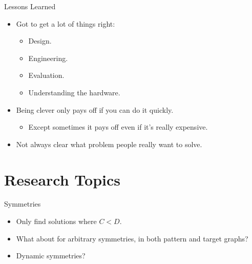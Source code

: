 \documentclass[aspectratio=169,compress,10pt]{beamer}
\begin{document}
\begin{frame}{Lessons Learned}
    \begin{itemize}
        \item Got to get a lot of things right:
            \begin{itemize}
                \item Design.
                \item Engineering.
                \item Evaluation.
                \item Understanding the hardware.
            \end{itemize}
        \item Being clever only pays off if you can do it quickly.
            \begin{itemize}
                \item Except sometimes it pays off even if it's really expensive.
            \end{itemize}
        \item Not always clear what problem people really want to solve.
    \end{itemize}
\end{frame}

\section{Research Topics}

\begin{frame}{Symmetries}
    \centering

    \begin{itemize}
        \item <2-> Only find solutions where $C < D$.
        \item <3-> What about for arbitrary symmetries, in both pattern and target graphs?
        \item <4-> Dynamic symmetries?
    \end{itemize}
\end{frame}
\end{document}
